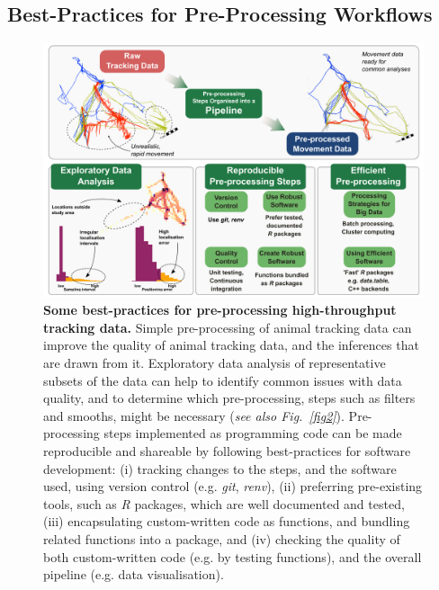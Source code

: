 \begin{refsection}[sorting=nyt]
    \section*{Best-Practices for Pre-Processing Workflows}

    \begin{figure}
        \begin{addmargin}{-.3\textwidth}%
        \centering
        \captionsetup{width=13.5cm}
        \includegraphics[width=13.5cm]{figures/preprocessing/fig_01.png}
        \end{addmargin}
        \caption{
            {\small
            \textbf{Some best-practices for pre-processing high-throughput tracking data.}
            Simple pre-processing of animal tracking data can improve the quality of animal tracking data, and the inferences that are drawn from it.
            Exploratory data analysis of representative subsets of the data can help to identify common issues with data quality, and to determine which pre-processing, steps such as filters and smooths, might be necessary (\textit{see also Fig.~\ref{fig2}}).
            Pre-processing steps implemented as programming code can be made reproducible and shareable by following best-practices for software development: (i) tracking changes to the steps, and the software used, using version control (e.g. \textit{git}, \textit{renv}), (ii) preferring pre-existing tools, such as \textit{R} packages, which are well documented and tested, (iii) encapsulating custom-written code as functions, and bundling related functions into a package, and (iv) checking the quality of both custom-written code (e.g. by testing functions), and the overall pipeline (e.g. data visualisation).
}}
\end{figure}
\end{refsection}
